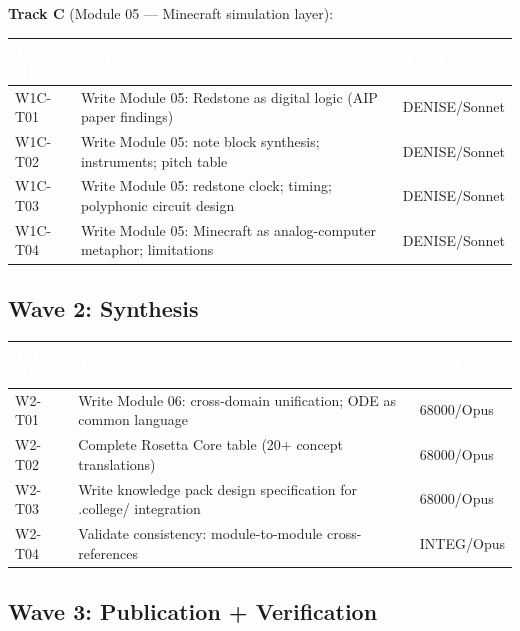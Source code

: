 \documentclass[11pt,letterpaper]{article}
\newcommand{\tableheader}[1]{\textbf{\sffamily\textcolor{white}{#1}}}
\begin{document}
\textbf{Track C} (Module 05 --- Minecraft simulation layer):

\begin{center}
\begin{tabularx}{\textwidth}{L{2.5cm}XC{2cm}}
\toprule
{}
\tableheader{Task ID} & \tableheader{Task} & \tableheader{Agent} \\
\midrule
W1C-T01 & Write Module 05: Redstone as digital logic (AIP paper findings) & DENISE/Sonnet \\
W1C-T02 & Write Module 05: note block synthesis; instruments; pitch table & DENISE/Sonnet \\
W1C-T03 & Write Module 05: redstone clock; timing; polyphonic circuit design & DENISE/Sonnet \\
W1C-T04 & Write Module 05: Minecraft as analog-computer metaphor; limitations & DENISE/Sonnet \\
\bottomrule
\end{tabularx}
\end{center}

\subsection{Wave 2: Synthesis}

\begin{center}
\begin{tabularx}{\textwidth}{L{2.5cm}XC{2cm}}
\toprule
{}
\tableheader{Task ID} & \tableheader{Task} & \tableheader{Agent} \\
\midrule
W2-T01 & Write Module 06: cross-domain unification; ODE as common language & 68000/Opus \\
W2-T02 & Complete Rosetta Core table (20+ concept translations) & 68000/Opus \\
W2-T03 & Write knowledge pack design specification for .college/ integration & 68000/Opus \\
W2-T04 & Validate consistency: module-to-module cross-references & INTEG/Opus \\
\bottomrule
\end{tabularx}
\end{center}

\subsection{Wave 3: Publication + Verification}
\end{document}
